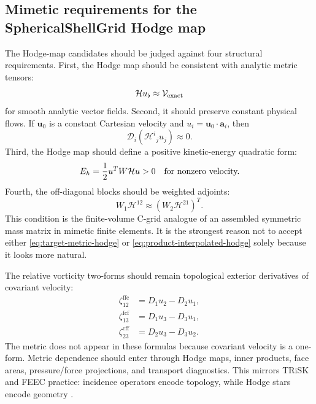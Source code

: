 \documentclass[11pt]{article}
\newcommand{\bvec}[1]{\bm{#1}}
\newcommand{\mc}[1]{\mathcal{#1}}
\newcommand{\Div}{\mc{D}}
\newcommand{\Hodge}{\mc{H}}
\newcommand{\Vflux}{\mc{V}}
\newcommand{\loc}[1]{^{\mathrm{#1}}}
\begin{document}
\subsection{Mimetic requirements for the SphericalShellGrid Hodge map}
\label{subsec:mimetic-requirements}

The Hodge-map candidates should be judged against four structural requirements.
First, the Hodge map should be consistent with analytic metric tensors:
\begin{equation}
  \Hodge u_\flat \approx \Vflux_{\rm exact}
\end{equation}
for smooth analytic vector fields.  Second, it should preserve constant physical flows.  If \(\bvec{u}_0\) is a constant Cartesian velocity and \(u_i=\bvec{u}_0\cdot\bvec{a}_i\), then
\begin{equation}
  \Div_i \left(\Hodge^i{}_j u_j\right) \approx 0.
  \label{eq:freestream-hodge-test}
\end{equation}
Third, the Hodge map should define a positive kinetic-energy quadratic form:
\begin{equation}
  E_h = \frac12 u^T W\Hodge u >0
  \quad \hbox{for nonzero velocity.}
  \label{eq:hodge-positive-energy}
\end{equation}
Fourth, the off-diagonal blocks should be weighted adjoints:
\begin{equation}
  W_1\Hodge^{12}
  \approx
  (W_2\Hodge^{21})^T.
  \label{eq:offdiag-adjointness}
\end{equation}
This condition is the finite-volume C-grid analogue of an assembled symmetric mass matrix in mimetic finite elements.  It is the strongest reason not to accept either \eqref{eq:target-metric-hodge} or \eqref{eq:product-interpolated-hodge} solely because it looks more natural.

The relative vorticity two-forms should remain topological exterior derivatives of covariant velocity:
\begin{align}
  \zeta_{12}\loc{ffc} &= D_1 u_2 - D_2 u_1, \\
  \zeta_{13}\loc{fcf} &= D_1 u_3 - D_3 u_1, \\
  \zeta_{23}\loc{cff} &= D_2 u_3 - D_3 u_2.
\end{align}
The metric does not appear in these formulas because covariant velocity is a one-form.  Metric dependence should enter through Hodge maps, inner products, face areas, pressure/force projections, and transport diagnostics.  This mirrors TRiSK and FEEC practice: incidence operators encode topology, while Hodge stars encode geometry \citep{Ringler2010,ThuburnCotter2012,ThuburnCotter2014,McRaeCotter2013}.
\end{document}
